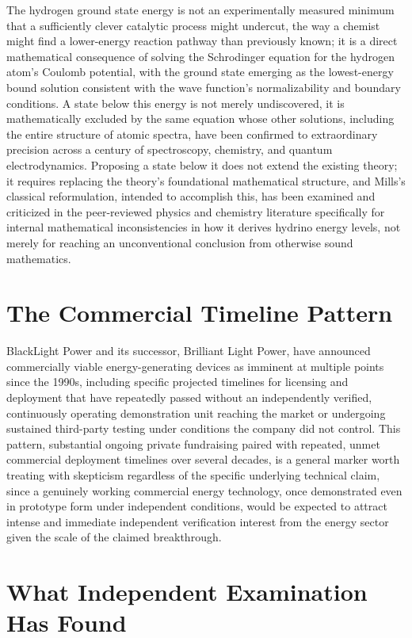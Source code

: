 \documentclass[11pt]{article}
\begin{document}
The hydrogen ground state energy is not an experimentally measured minimum that a sufficiently clever catalytic process might undercut, the way a chemist might find a lower-energy reaction pathway than previously known; it is a direct mathematical consequence of solving the Schrodinger equation for the hydrogen atom's Coulomb potential, with the ground state emerging as the lowest-energy bound solution consistent with the wave function's normalizability and boundary conditions. A state below this energy is not merely undiscovered, it is mathematically excluded by the same equation whose other solutions, including the entire structure of atomic spectra, have been confirmed to extraordinary precision across a century of spectroscopy, chemistry, and quantum electrodynamics. Proposing a state below it does not extend the existing theory; it requires replacing the theory's foundational mathematical structure, and Mills's classical reformulation, intended to accomplish this, has been examined and criticized in the peer-reviewed physics and chemistry literature specifically for internal mathematical inconsistencies in how it derives hydrino energy levels, not merely for reaching an unconventional conclusion from otherwise sound mathematics.

\section{The Commercial Timeline Pattern}

BlackLight Power and its successor, Brilliant Light Power, have announced commercially viable energy-generating devices as imminent at multiple points since the 1990s, including specific projected timelines for licensing and deployment that have repeatedly passed without an independently verified, continuously operating demonstration unit reaching the market or undergoing sustained third-party testing under conditions the company did not control. This pattern, substantial ongoing private fundraising paired with repeated, unmet commercial deployment timelines over several decades, is a general marker worth treating with skepticism regardless of the specific underlying technical claim, since a genuinely working commercial energy technology, once demonstrated even in prototype form under independent conditions, would be expected to attract intense and immediate independent verification interest from the energy sector given the scale of the claimed breakthrough.

\section{What Independent Examination Has Found}
\end{document}
